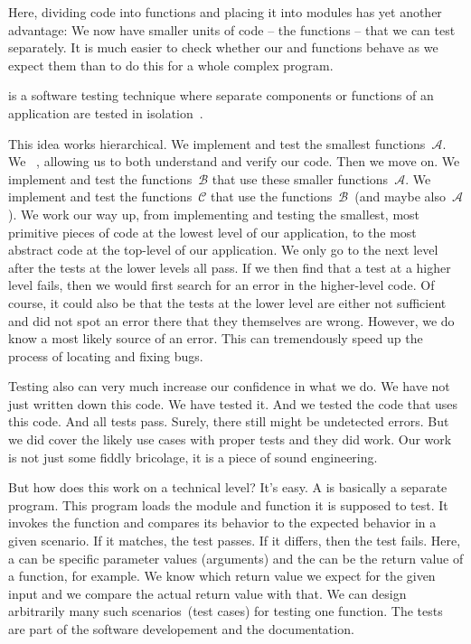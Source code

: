 Here, dividing code into functions and placing it into modules has yet another advantage:
We now have smaller units of code -- the functions -- that we can test separately.
It is much easier to check whether our  and  functions behave as we expect them than to do this for a whole complex program.%
%
\begin{definition}
\label{def:unitTesting}%
 is a software testing technique where separate components or functions of an application are tested in isolation~\cite{P2021PUTAAOAEUTIP,R2006ASOUTP,TLG2006UTCU,O1991UTVIT,B2004JPG,O2003UTTETO}.%
\end{definition}%
%
This idea works hierarchical.
We implement and test the smallest functions~$\mathcal{A}$.
We ~\cite{BG2000TIPLWT}, allowing us to both understand and verify our code.
Then we move on.
We implement and test the functions~$\mathcal{B}$ that use these smaller functions~$\mathcal{A}$.
We implement and test the functions~$\mathcal{C}$ that use the functions~$\mathcal{B}$~(and maybe also~$\mathcal{A}$).
We work our way up, from implementing and testing the smallest, most primitive pieces of code at the lowest level of our application, to the most abstract code at the top-level of our application.
We only go to the next level after the tests at the lower levels all pass.
If we then find that a test at a higher level fails, then we would first search for an error in the higher-level code.
Of course, it could also be that the tests at the lower level are either not sufficient and did not spot an error there that they themselves are wrong.
However, we do know a most likely source of an error.
This can tremendously speed up the process of locating and fixing bugs.

Testing also can very much increase our confidence in what we do.
We have not just written down this code.
We have tested it.
And we tested the code that uses this code.
And all tests pass.
Surely, there still might be undetected errors.
But we did cover the likely use cases with proper tests and they did work.
Our work is not just some fiddly bricolage, it is a piece of sound engineering.

But how does this work on a technical level?
It's easy.
A  is basically a separate program.
This program loads the module and function it is supposed to test.
It invokes the function and compares its behavior to the expected behavior in a given scenario.
If it matches, the test passes.
If it differs, then the test fails.
Here, a  can be specific parameter values (arguments) and the  can be the return value of a function, for example.
We know which return value we expect for the given input and we compare the actual return value with that.
We can design arbitrarily many such scenarios~(test cases) for testing one function.
The tests are part of the software developement and the documentation.

